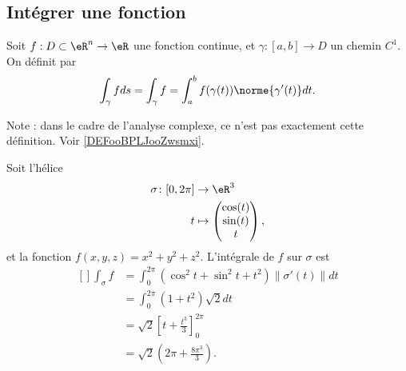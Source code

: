 \subsection{Intégrer une fonction}

\begin{definition}      \label{DEFooFAYUooCaUdyo}
	Soit \( f : D \subset \eR^n \to \eR\) une fonction continue, et \( \gamma : [a,b] \to D\) un chemin \( C^1\). On définit  par
	\begin{equation}    \label{EqhJGRcb}
		\int_\gamma f d s = \int_\gamma f = \int_a^b f(\gamma(t)) \norme{\gamma^\prime(t)} d t.
	\end{equation}
\end{definition}
Note : dans le cadre de l'analyse complexe, ce n'est pas exactement cette définition. Voir \ref{DEFooBPLJooZwsmxi}.

\begin{example}
	Soit l'hélice
	\begin{equation}
		\begin{aligned}
			\sigma\colon \mathopen[ 0 , 2\pi \mathclose] & \to \eR^3              \\
			t                                            & \mapsto \begin{pmatrix}
				                                                       \cos(t) \\
				                                                       \sin(t) \\
				                                                       t
			                                                       \end{pmatrix},
		\end{aligned}
	\end{equation}
	et la fonction \( f(x,y,z)=x^2+y^2+z^2\). L'intégrale de \( f\) sur \( \sigma\) est
	\begin{equation}
		\begin{aligned}[]
			\int_{\sigma}f & =\int_0^{2\pi}(\cos^2t+\sin^2t+t^2)\| \sigma'(t) \|dt \\
			               & =\int_0^{2\pi}(1+t^2)\sqrt{2}dt                       \\
			               & =\sqrt{2}\left[ t+\frac{ t^3 }{ 3 } \right]_0^{2\pi}  \\
			               & =\sqrt{2}\left( 2\pi+\frac{ 8\pi^3 }{ 3 } \right).
		\end{aligned}
	\end{equation}
\end{example}

